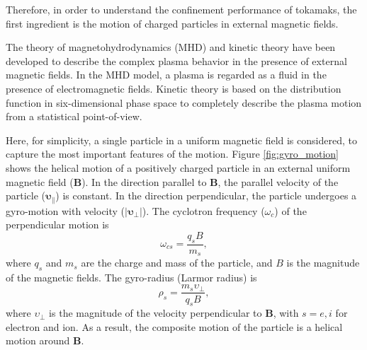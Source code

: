 Therefore, in order to understand the confinement performance of tokamaks, the first ingredient is the motion of charged particles in external magnetic fields.

The theory of magnetohydrodynamics (MHD) \cite{Goldston_1995_Plasma, Freidberg_2007_Plasma} and kinetic theory \cite{Stix_1992_Waves, Bittencourt_2004_Plasma} have been developed to describe the complex plasma behavior in the presence of external magnetic fields. In the MHD model, a plasma is regarded as a fluid in the presence of electromagnetic fields. Kinetic theory is based on the distribution function in six-dimensional phase space to completely describe the plasma motion from a statistical point-of-view.

Here, for simplicity, a single particle in a uniform magnetic field is considered, to capture the most important features of the motion. Figure \ref{fig:gyro_motion} shows the helical motion of a positively charged particle in an external uniform magnetic field ($\textbf{B}$). In the direction parallel to $\textbf{B}$, the parallel velocity of the particle ($\boldsymbol{\upsilon}_{\parallel}$) is constant. In the direction perpendicular, the particle undergoes a gyro-motion with velocity ($|\boldsymbol{\upsilon}_{\perp}|$). The cyclotron frequency ($\omega_{c}$) of the perpendicular motion is%
\begin{equation}
  \omega_{cs} = \frac{q_s B}{m_{s}},
\end{equation}
\noindent where $q_s$ and $m_s$ are the charge and mass of the particle, and $B$ is the magnitude of the magnetic fields. The gyro-radius (Larmor radius) is%
\begin{equation}
  \rho_s = \frac{m_s \upsilon_{\perp} }{q_s B},
\end{equation}
\noindent where $\upsilon_{\perp}$ is the magnitude of the velocity perpendicular to $\textbf{B}$, with $s = e, i$ for electron and ion. As a result, the composite motion of the particle is a helical motion around $\textbf{B}$.


